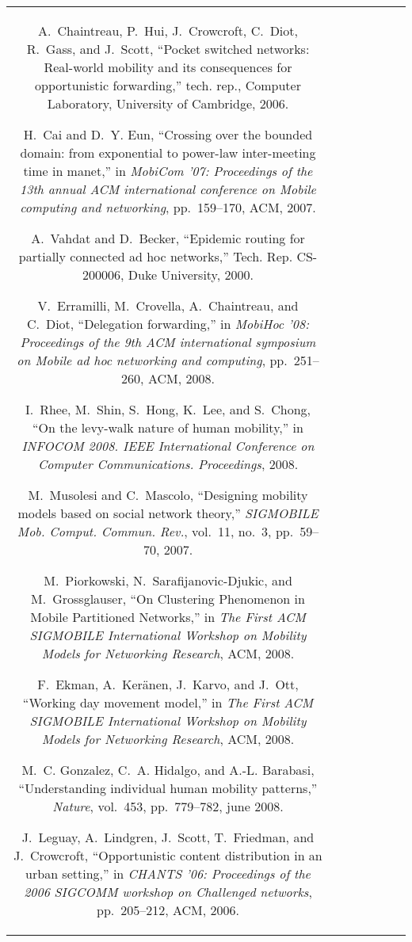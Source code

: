 \documentclass[conference]{IEEEtran}
\begin{document}
\begin{table*}
\begin{center}
\begin{tabular}{|c|c|c|c|c|c|c|}
\begin{thebibliography}{10}
\bibitem{UCAM-CL-TR-617}
A.~Chaintreau, P.~Hui, J.~Crowcroft, C.~Diot, R.~Gass, and J.~Scott, ``Pocket
  switched networks: Real-world mobility and its consequences for opportunistic
  forwarding,'' tech. rep., Computer Laboratory, University of Cambridge, 2006.

\bibitem{cai07mobicom}
H.~Cai and D.~Y. Eun, ``Crossing over the bounded domain: from exponential to
  power-law inter-meeting time in manet,'' in {\em MobiCom '07: Proceedings of
  the 13th annual ACM international conference on Mobile computing and
  networking}, pp.~159--170, ACM, 2007.

\bibitem{vahdat00epidemic}
A.~Vahdat and D.~Becker, ``Epidemic routing for partially connected ad hoc
  networks,'' Tech. Rep. CS-200006, Duke University, 2000.

\bibitem{dfw08}
V.~Erramilli, M.~Crovella, A.~Chaintreau, and C.~Diot, ``Delegation
  forwarding,'' in {\em MobiHoc '08: Proceedings of the 9th ACM international
  symposium on Mobile ad hoc networking and computing}, pp.~251--260, ACM,
  2008.

\bibitem{levy}
I.~Rhee, M.~Shin, S.~Hong, K.~Lee, and S.~Chong, ``On the levy-walk nature of
  human mobility,'' in {\em INFOCOM 2008. IEEE International Conference on
  Computer Communications. Proceedings}, 2008.

\bibitem{musolesi07}
M.~Musolesi and C.~Mascolo, ``Designing mobility models based on social network
  theory,'' {\em SIGMOBILE Mob. Comput. Commun. Rev.}, vol.~11, no.~3,
  pp.~59--70, 2007.

\bibitem{LCA-CONF-2008-049}
M.~Piorkowski, N.~Sarafijanovic-Djukic, and M.~Grossglauser, ``On {C}lustering
  {P}henomenon in {M}obile {P}artitioned {N}etworks,'' in {\em The {F}irst
  {ACM} {SIGMOBILE} {I}nternational {W}orkshop on {M}obility {M}odels for
  {N}etworking {R}esearch}, ACM, 2008.

\bibitem{workingDay}
F.~Ekman, A.~Keränen, J.~Karvo, and J.~Ott, ``Working day movement model,'' in
  {\em The {F}irst {ACM} {SIGMOBILE} {I}nternational {W}orkshop on {M}obility
  {M}odels for {N}etworking {R}esearch}, ACM, 2008.

\bibitem{barabasi08}
M.~C. Gonzalez, C.~A. Hidalgo, and A.-L. Barabasi, ``Understanding individual
  human mobility patterns,'' {\em Nature}, vol.~453, pp.~779--782, june 2008.

\bibitem{leguay06}
J.~Leguay, A.~Lindgren, J.~Scott, T.~Friedman, and J.~Crowcroft,
  ``Opportunistic content distribution in an urban setting,'' in {\em CHANTS
  '06: Proceedings of the 2006 SIGCOMM workshop on Challenged networks},
  pp.~205--212, ACM, 2006.


\end{thebibliography}
\end{tabular}
\end{center}
\end{table*}
\end{document}
